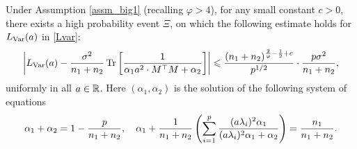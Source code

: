\begin{theorem}\label{thm_main_RMT}
Under Assumption \ref{assm_big1} (recalling $\varphi > 4$), for any small constant $c>0$, there exists a high probability event $\Xi$, on which the following estimate holds for $L_{\operatorname{Var}}(a)$ in \eqref{Lvar}:
	\begin{align}\label{lem_cov_shift_eq}
		\bigabs{L_{\var}(a)- \frac{\sigma^2}{n_1+n_2}\bigtr{  \frac{1}{\alpha_1 a^2\cdot M^\top M + \alpha_2}  }}
		\le \frac{(n_1+n_2)^{\frac 2{\varphi} - \frac 1 2 + c}}{p^{1/2}}\cdot\frac{p \sigma^2}{n_1+ n_2},
	\end{align}
	uniformly in all $a\in \mathbb{R}$. Here $(\alpha_1, \alpha_2)$ is the solution of the following system of equations
	\begin{align}
		\alpha_1 + \alpha_2 = 1- \frac{p}{n_1 + n_2}, \quad
		\alpha_1 + \frac1{n_1 + n_2}  \bigbrace{\sum_{i=1}^p \frac{(a \lambda_i)^2 \alpha_1}{(a \lambda_i)^2 \alpha_1 + \alpha_2}} = \frac{n_1}{n_1 + n_2}. \label{eq_a12extra}
	\end{align}
\end{theorem}

